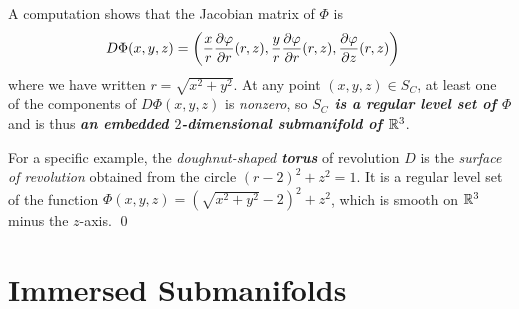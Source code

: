 \documentclass[11pt]{article}
\begin{document}
\begin{itemize}
\begin{example}
A computation shows that the Jacobian matrix of $\Phi$ is
\begin{align*}
D\Phi(x, y, z) &= \left(\frac{x}{r}\frac{\partial \varphi}{ \partial r}(r, z), \frac{y}{r}\frac{\partial \varphi}{ \partial r}(r, z), \frac{\partial \varphi}{ \partial z}(r, z)\right)
\end{align*} where we have written $r = \sqrt{x^2 + y^2}$.  At any point $(x, y, z) \in S_C$, at least one of the components of $D\Phi(x, y, z)$ is \emph{nonzero}, so \emph{\textbf{$S_C$ is a regular level set of $\Phi$}} and is thus \emph{\textbf{an embedded $2$-dimensional submanifold of ${\mathbb R}^3$}}.

For a specific example, the \emph{doughnut-shaped \textbf{torus}} of revolution $D$ is the \emph{surface of revolution} obtained from the circle $(r-2)^2 +
z^2 = 1$. It is a regular level set of the function $\Phi(x,y,z) = (\sqrt{x^2 + y^2}-2)^2 + z^2$, which is smooth on ${\mathbb R}^3$ minus the $z$-axis. \qed
\end{example}

\end{itemize}


\section{Immersed Submanifolds}
\end{document}
